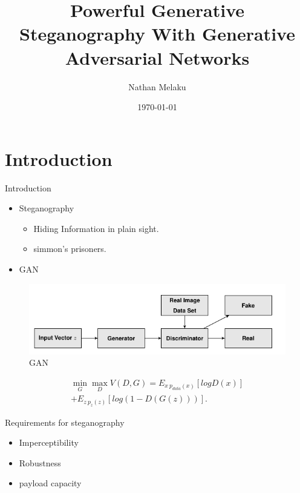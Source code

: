 \documentclass[11pt]{beamer}
\author{Nathan Melaku}
\title{Powerful Generative Steganography With Generative Adversarial Networks}
\institute{BahirDar Institute Of Technology}
\date{\today}
\begin{document}
\begin{frame} %
	\titlepage
\end{frame}

\begin{frame} %
\tableofcontents
\end{frame}

\section{Introduction}
\begin{frame}{Introduction} %

\begin{itemize}
\item Steganography
\begin{itemize}
	\item <1-> Hiding Information in plain sight.
	\item <2-> simmon's prisoners. \cite{simmons1984prisoners}
\end{itemize}
\end{itemize}
\end{frame}

\begin{frame} %

\begin{itemize}
	\item GAN
\end{itemize}

\begin{figure}
	\includegraphics[scale=.45]{gan}
	\caption{GAN}
\end{figure}

\begin{multline*}
\min_G\max_D V(D,G) = E_{x~p_{data}(x)}[log D(x)] \\
+ E_{z~p_z(z)}[log(1 - D(G(z)))].
\end{multline*}

\end{frame}

\begin{frame} %

Requirements for steganography 
	\begin{itemize}
		\item<1-> Imperceptibility 
		\item<2->  Robustness 
		\item<3->  payload capacity 
	\end{itemize}
\end{frame}
\end{document}
